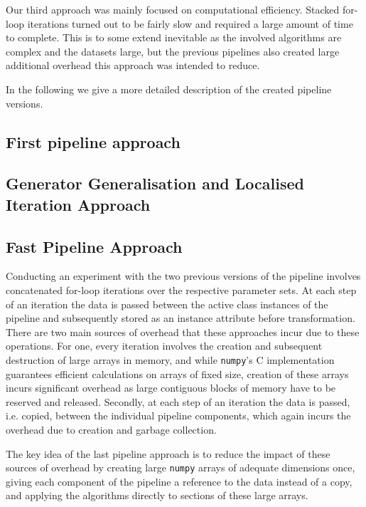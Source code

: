 Our third approach was mainly focused on computational efficiency. 
Stacked for-loop iterations turned out to be fairly slow and required a large amount of time to complete.
This is to some extend inevitable as the involved algorithms are complex and the datasets large, 
but the previous pipelines also created large additional overhead this approach was intended to reduce.

In the following we give a more detailed description of the created pipeline versions.

\subsection{First pipeline approach}



\subsection{Generator Generalisation and Localised Iteration Approach}



\subsection{Fast Pipeline Approach}

Conducting an experiment with the two previous versions of the pipeline involves concatenated for-loop iterations over the respective parameter sets.
At each step of an iteration the data is passed between the active class instances of the pipeline and subsequently stored as an instance attribute before transformation.
There are two main sources of overhead that these approaches incur due to these operations.
For one, every iteration involves the creation and subsequent destruction of large arrays in memory, 
and while \texttt{numpy}'s C implementation guarantees efficient calculations on arrays of fixed size, 
creation of these arrays incurs significant overhead as large contiguous blocks of memory have to be reserved and released.
Secondly, at each step of an iteration the data is passed, i.e. copied, 
between the individual pipeline components, which again incurs the overhead due to creation and garbage collection.

The key idea of the last pipeline approach is to reduce the impact of these sources of overhead by creating large \texttt{numpy} arrays of adequate dimensions once,
giving each component of the pipeline a reference to the data instead of a copy, and applying the algorithms directly to sections of these large arrays.

